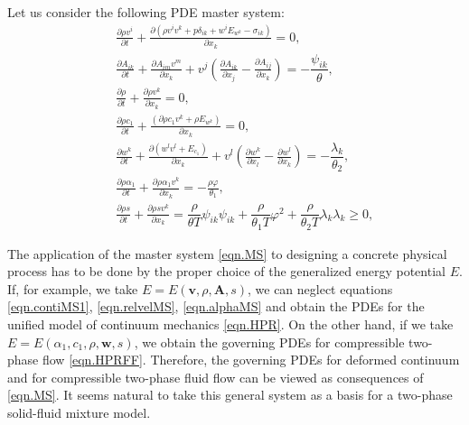 \documentclass[3p,times,table]{article}
\renewcommand{\AA}{{\bm{A}}}
\newcommand{\vv}{{\bm{v}}}
\newcommand{\ww}{{\bm{w}}}
\begin{document}
Let us consider the following PDE master system:
\begin{subequations}\label{eqn.MS}
	\begin{eqnarray}
&&\displaystyle\frac{\partial \rho v^i}{\partial t}+\frac{\partial 
	(\rho v^i v^k + p \delta_{ik} + w^iE_{w^k} -\sigma_{ik} )}{\partial x_k}=0, 
\label{eqn.momentumMS}\\[2mm]
	&&\displaystyle\frac{\partial A_{i k}}{\partial t}+\frac{\partial A_{im} 
	v^m}{\partial x_k}+v^j\left(\frac{\partial A_{ik}}{\partial 
	x_j}-\frac{\partial A_{ij}}{\partial x_k}\right)
=-\dfrac{ \psi_{ik} }{\theta},\label{eqn.deformationMS}\\[2mm]
&& \frac{\partial \rho}{\partial t}+\frac{\partial \rho v^k}{\partial 
	x_k}=0,\label{eqn.contiMS}\\[2mm]
&& \frac{\partial \rho c_1}{\partial t}+\frac{(\partial \rho c_1 v^k+\rho 
E_{w^k})}{\partial 
	x_k}=0,\label{eqn.contiMS1}\\[2mm]
&&\displaystyle\frac{\partial w^k}{\partial t}+\frac{\partial (w^lv^l+E_{c_1})}{\partial 
x_k}
+v^l\left(\frac{\partial w^k}{\partial x_l}-
\frac{\partial w^l}{\partial x_k}\right)
=-\dfrac{ \lambda_{k} }{\theta_2},\label{eqn.relvelMS}\\[2mm]
&& \frac{\partial \rho \alpha_1}{\partial t}+\frac{\partial \rho \alpha_1 v^k 
}{\partial 
	x_k}=-\frac{\rho \varphi}{\theta_1},\label{eqn.alphaMS}\\[2mm]
&&\displaystyle\frac{\partial \rho s}{\partial t}+\frac{\partial \rho 
	s v^k }{\partial x_k}=\dfrac{\rho}{\theta T}\psi_{ik} \psi_{ik}+
\dfrac{\rho}{\theta_1 T}\varphi^2 +
\dfrac{\rho}{\theta_2 T}\lambda_k \lambda_k \geq0, 
\label{eqn.entropyMS}
\end{eqnarray}
\end{subequations}
   
The application of the master system \eqref{eqn.MS} to designing a concrete 
physical process has to 
be done by the proper choice of the generalized energy potential $ E $. If, for 
example, we take $E=E(\vv,\rho,\AA,s)$, we can neglect equations 
\eqref{eqn.contiMS1}, \eqref{eqn.relvelMS}, \eqref{eqn.alphaMS} and obtain
the PDEs for the unified model of continuum mechanics \eqref{eqn.HPR}.
On the other hand, if we take $E=E(\alpha_1, c_1, \rho, \ww, s)$, we 
obtain the 
governing PDEs for compressible two-phase flow \eqref{eqn.HPRFF}. Therefore,
the governing PDEs for deformed continuum and for compressible two-phase fluid 
flow can be viewed as consequences of \eqref{eqn.MS}. It seems natural to 
take this general system as a basis for a two-phase solid-fluid mixture model. 
\end{document}
